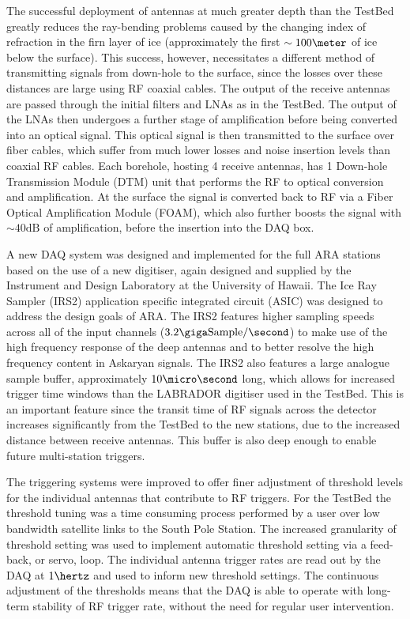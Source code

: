 The successful deployment of antennas at much greater depth than the TestBed greatly reduces the ray-bending problems caused by the changing index of refraction in the firn layer of ice (approximately the first $\sim 100 \meter$ of ice below the surface). This success, however, necessitates a different method of transmitting signals from down-hole to the surface, since the losses over these distances are large using RF coaxial cables. The output of the receive antennas are passed through the initial filters and LNAs as in the TestBed. The output of the LNAs then undergoes a further stage of amplification before being converted into an optical signal. This optical signal is then transmitted to the surface over fiber cables, which suffer from much lower losses and noise insertion levels than coaxial RF cables. Each borehole, hosting 4 receive antennas, has 1 Down-hole Transmission Module (DTM) unit that performs the RF to optical conversion and amplification. At the surface the signal is converted back to RF via a Fiber Optical Amplification Module (FOAM), which also further boosts the signal with $\sim 40 \mbox{dB}$ of amplification, before the insertion into the DAQ box.

A new DAQ system was designed and implemented for the full ARA stations based on the use of a new digitiser, again designed and supplied by the Instrument and Design Laboratory at the University of Hawaii. The Ice Ray Sampler (IRS2) application specific integrated circuit (ASIC) was designed to address the design goals of ARA. The IRS2 features higher sampling speeds across all of the input channels ($3.2 \giga \mbox{Sample} /\second$) to make use of the high frequency response of the deep antennas and to better resolve the high frequency content in Askaryan signals. The IRS2 also features a large analogue sample buffer, approximately $10 \micro \second$ long, which allows for increased trigger time windows than the LABRADOR digitiser used in the TestBed. This is an important feature since the transit time of RF signals across the detector increases significantly from the TestBed to the new stations, due to the increased distance between receive antennas. This buffer is also deep enough to enable future multi-station triggers.

The triggering systems were improved to offer finer adjustment of threshold levels for the individual antennas that contribute to RF triggers. For the TestBed the threshold tuning was a time consuming process performed by a user over low bandwidth satellite links to the South Pole Station. The increased granularity of threshold setting was used to implement automatic threshold setting via a feed-back, or servo, loop. The individual antenna trigger rates are read out by the DAQ at $1 \hertz$ and used to inform new threshold settings. The continuous adjustment of the thresholds means that the DAQ is able to operate with long-term stability of RF trigger rate, without the need for regular user intervention.


